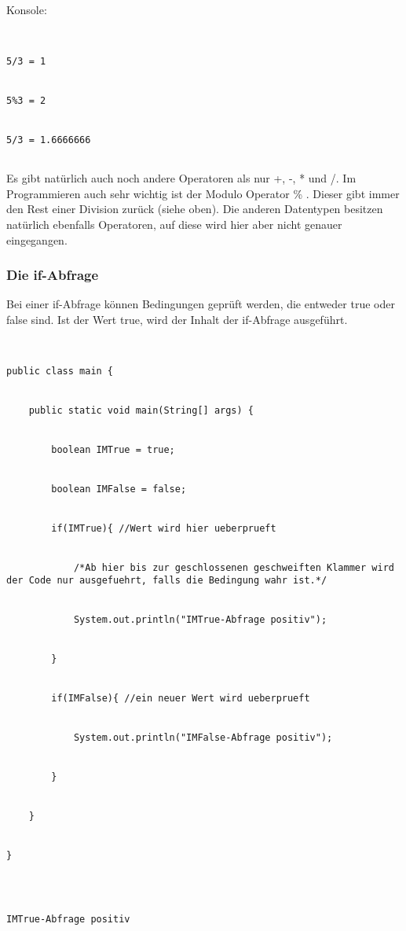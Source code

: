 Konsole:


\begin{lstlisting}[style=console]


5/3 = 1


5%3 = 2


5/3 = 1.6666666


\end{lstlisting}


Es gibt natürlich auch noch andere Operatoren als nur +, -, * und /. Im Programmieren auch sehr wichtig ist der Modulo Operator \% . Dieser gibt immer den Rest einer Division zurück (siehe oben). Die anderen Datentypen besitzen natürlich ebenfalls Operatoren, auf diese wird hier aber nicht genauer eingegangen.


\subsubsection{Die if-Abfrage}


Bei einer if-Abfrage können Bedingungen geprüft werden, die entweder true oder false sind. Ist der Wert true, wird der Inhalt der if-Abfrage ausgeführt.


\begin{lstlisting}


public class main {


	public static void main(String[] args) {


		boolean IMTrue = true;


		boolean IMFalse = false;


		if(IMTrue){ //Wert wird hier ueberprueft


			/*Ab hier bis zur geschlossenen geschweiften Klammer wird der Code nur ausgefuehrt, falls die Bedingung wahr ist.*/


			System.out.println("IMTrue-Abfrage positiv");


		}


		if(IMFalse){ //ein neuer Wert wird ueberprueft


			System.out.println("IMFalse-Abfrage positiv");


		}


	}


}	


\end{lstlisting}


\begin{lstlisting}[style=console]


IMTrue-Abfrage positiv


\end{lstlisting}


